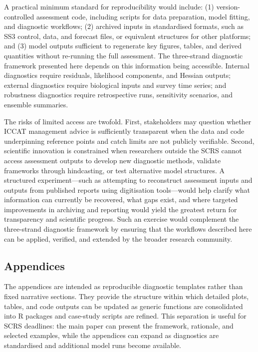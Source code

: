 \documentclass[11pt,a4paper]{article}
\begin{document}
A practical minimum standard for reproducibility would include: (1) version-controlled assessment code, including scripts for data preparation, model fitting, and diagnostic workflows; (2) archived inputs in standardised formats, such as SS3 control, data, and forecast files, or equivalent structures for other platforms; and (3) model outputs sufficient to regenerate key figures, tables, and derived quantities without re-running the full assessment. The three-strand diagnostic framework presented here depends on this information being accessible. Internal diagnostics require residuals, likelihood components, and Hessian outputs; external diagnostics require biological inputs and survey time series; and robustness diagnostics require retrospective runs, sensitivity scenarios, and ensemble summaries.

The risks of limited access are twofold. First, stakeholders may question whether ICCAT management advice is sufficiently transparent when the data and code underpinning reference points and catch limits are not publicly verifiable. Second, scientific innovation is constrained when researchers outside the SCRS cannot access assessment outputs to develop new diagnostic methods, validate frameworks through hindcasting, or test alternative model structures. A structured experiment—such as attempting to reconstruct assessment inputs and outputs from published reports using digitisation tools—would help clarify what information can currently be recovered, what gaps exist, and where targeted improvements in archiving and reporting would yield the greatest return for transparency and scientific progress. Such an exercise would complement the three-strand diagnostic framework by ensuring that the workflows described here can be applied, verified, and extended by the broader research community.


\subsection{Appendices}

The appendices are intended as reproducible diagnostic templates rather than fixed narrative sections. They provide the structure within which detailed plots, tables, and code outputs can be updated as generic functions are consolidated into R packages and case-study scripts are refined. This separation is useful for SCRS deadlines: the main paper can present the framework, rationale, and selected examples, while the appendices can expand as diagnostics are standardised and additional model runs become available.
\end{document}
